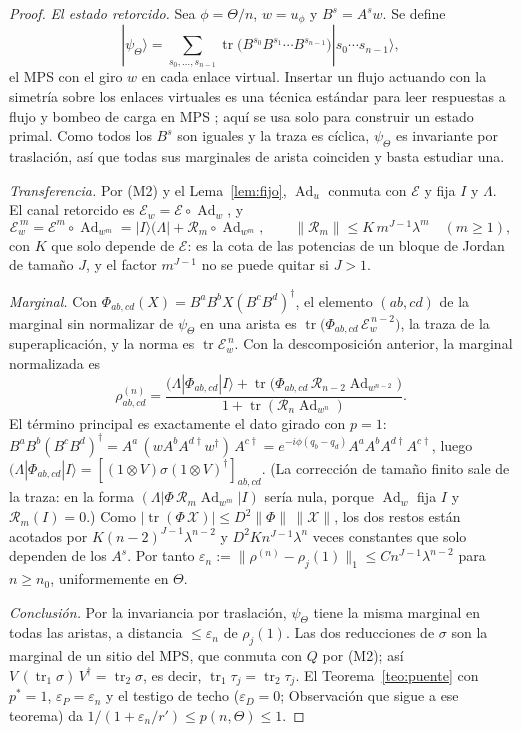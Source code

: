\documentclass[11pt,a4paper]{article}
\theoremstyle{remark}
\newcommand{\tr}{\operatorname{tr}}
\newcommand{\Ad}{\operatorname{Ad}}
\newcommand{\ket}[1]{|#1\rangle}
\begin{document}
\begin{proof}
\emph{El estado retorcido.} Sea $\phi=\Theta/n$, $w=u_\phi$ y $B^s=A^sw$. Se define
\[
  \ket{\psi_\Theta}=\sum_{s_0,\dots,s_{n-1}}\tr\big(B^{s_0}B^{s_1}\cdots B^{s_{n-1}}\big)\ket{s_0\cdots s_{n-1}},
\]
el MPS con el giro $w$ en cada enlace virtual. Insertar un flujo actuando con la simetría sobre
los enlaces virtuales es una técnica estándar para leer respuestas a flujo y bombeo de carga en MPS
\cite{zaletel-mong-pollmann}; aquí se usa solo para construir un estado primal. Como todos los
$B^s$ son iguales y la traza es cíclica, $\psi_\Theta$ es invariante por traslación, así que todas
sus marginales de arista coinciden y basta estudiar una.

\emph{Transferencia.} Por (M2) y el Lema~\ref{lem:fijo}, $\Ad_u$ conmuta con $\mathcal E$ y fija
$I$ y $\Lambda$. El canal retorcido es
$\mathcal E_w=\mathcal E\circ\Ad_w$, y
\[
  \mathcal E_w^{\,m}=\mathcal E^m\circ\Ad_{w^m}=\ket I(\Lambda|+\mathcal R_m\circ\Ad_{w^m},\qquad
  \|\mathcal R_m\|\le K\,m^{J-1}\lambda^m\quad(m\ge1),
\]
con $K$ que solo depende de $\mathcal E$: es la cota de las potencias de un bloque de Jordan de
tamaño $J$, y el factor $m^{J-1}$ no se puede quitar si $J>1$.

\emph{Marginal.} Con $\Phi_{ab,cd}(X)=B^aB^bX(B^cB^d)^\dagger$, el elemento $(ab,cd)$ de la
marginal sin normalizar de $\psi_\Theta$ en una arista es $\tr\big(\Phi_{ab,cd}\,\mathcal E_w^{\,n-2}\big)$,
la traza de la superaplicación, y la norma es $\tr\mathcal E_w^{\,n}$. Con la descomposición
anterior, la marginal normalizada es
\[
  \rho^{(n)}_{ab,cd}=\frac{(\Lambda|\Phi_{ab,cd}\ket I+\tr\big(\Phi_{ab,cd}\,
  \mathcal R_{n-2}\Ad_{w^{n-2}}\big)}{1+\tr(\mathcal R_n\Ad_{w^n})}.
\]
El término principal es exactamente el dato girado con $p=1$:
$B^aB^b(B^cB^d)^\dagger=A^a\,(wA^bA^{d\dagger}w^\dagger)\,A^{c\dagger}=e^{-i\phi(q_b-q_d)}A^aA^bA^{d\dagger}A^{c\dagger}$,
luego $(\Lambda|\Phi_{ab,cd}\ket I=[(1\otimes V)\sigma(1\otimes V)^\dagger]_{ab,cd}$. (La corrección
de tamaño finito sale de la traza: en la forma $(\Lambda|\Phi\,\mathcal R_m\Ad_{w^m}|I)$ sería nula,
porque $\Ad_w$ fija $I$ y $\mathcal R_m(I)=0$.) Como $|\tr(\Phi\,\mathcal X)|\le D^2\|\Phi\|\,\|\mathcal X\|$,
los dos restos están acotados por $K(n-2)^{J-1}\lambda^{n-2}$ y $D^2Kn^{J-1}\lambda^n$ veces
constantes que solo dependen de los $A^s$. Por tanto
$\varepsilon_n:=\|\rho^{(n)}-\rho_j(1)\|_1\le Cn^{J-1}\lambda^{n-2}$ para
$n\ge n_0$, uniformemente en $\Theta$.

\emph{Conclusión.} Por la invariancia por traslación, $\psi_\Theta$ tiene la misma marginal en todas
las aristas, a distancia $\le\varepsilon_n$ de $\rho_j(1)$. Las dos reducciones de $\sigma$ son la
marginal de un sitio del MPS, que conmuta con $Q$ por (M2); así $V\,(\tr_1\sigma)\,V^\dagger=\tr_2\sigma$,
es decir, $\tr_1\tau_j=\tr_2\tau_j$. El Teorema~\ref{teo:puente} con $p^\ast=1$,
$\varepsilon_P=\varepsilon_n$ y el testigo de techo ($\varepsilon_D=0$; Observación que sigue a ese
teorema) da $1/(1+\varepsilon_n/r')\le p(n,\Theta)\le1$.
\end{proof}
\end{document}

